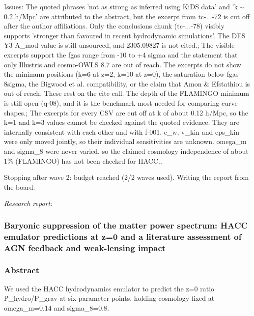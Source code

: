 \documentclass[11pt,a4paper]{article}
\begin{document}
Issues: The quoted phrases 'not as strong as inferred using KiDS data' and 'k \textasciitilde{} 0.2 h/Mpc' are attributed to the abstract, but the excerpt from tc-...-72 is cut off after the author affiliations. Only the conclusions chunk (tc-...-78) visibly supports 'stronger than favoured in recent hydrodynamic simulations'. The DES Y3 A\_mod value is still unsourced, and 2305.09827 is not cited.; The visible excerpts support the fgas range from -10 to +4 sigma and the statement that only Illustris and cosmo-OWLS 8.7 are out of reach. The excerpts do not show the minimum positions (k=6 at z=2, k=10 at z=0), the saturation below fgas-8sigma, the Bigwood et al. compatibility, or the claim that Amon \& Efstathiou is out of reach. These rest on the cite call. The depth of the FLAMINGO minimum is still open (q-08), and it is the benchmark most needed for comparing curve shapes.; The excerpts for every CSV are cut off at k of about 0.12 h/Mpc, so the k=1 and k=3 values cannot be checked against the quoted evidence. They are internally consistent with each other and with f-001. e\_w, v\_kin and eps\_kin were only moved jointly, so their individual sensitivities are unknown. omega\_m and sigma\_8 were never varied, so the claimed cosmology independence of about 1\% (FLAMINGO) has not been checked for HACC..

Stopping after wave 2: budget reached (2/2 waves used). Writing the report from the board.

\textit{Research report:}\par
\subsubsection*{Baryonic suppression of the matter power spectrum: HACC emulator predictions at z=0 and a literature assessment of AGN feedback and weak-lensing impact}
\subsubsection*{Abstract}
We used the HACC hydrodynamics emulator to predict the z=0 ratio P\_hydro/P\_grav at six parameter points, holding cosmology fixed at omega\_m=0.14 and sigma\_8=0.8.
\end{document}
